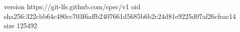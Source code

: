 version https://git-lfs.github.com/spec/v1
oid sha256:322cbb64c480cc703f6affb2407661d5685b6b2c24d81e9225d07af26cfeac14
size 125492
